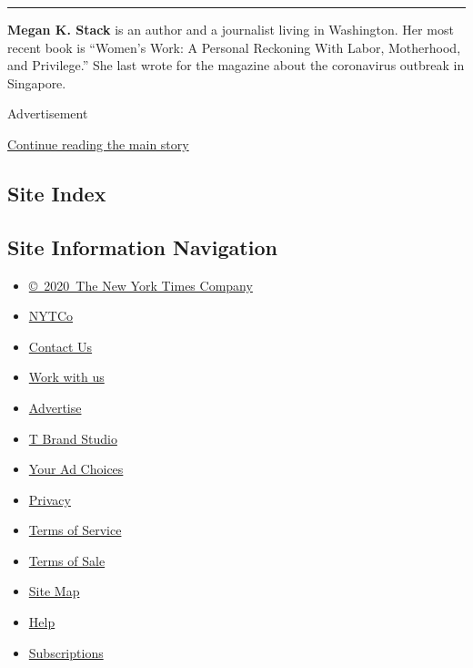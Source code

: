 \begin{center}\rule{0.5\linewidth}{\linethickness}\end{center}

\textbf{Megan K. Stack} is an author and a journalist living in
Washington. Her most recent book is ``Women's Work: A Personal Reckoning
With Labor, Motherhood, and Privilege.'' She last wrote for the magazine
about the coronavirus outbreak in Singapore.

Advertisement

\protect\hyperlink{after-bottom}{Continue reading the main story}

\hypertarget{site-index}{%
\subsection{Site Index}\label{site-index}}

\hypertarget{site-information-navigation}{%
\subsection{Site Information
Navigation}\label{site-information-navigation}}

\begin{itemize}
\tightlist
\item
  \href{https://help.nytimes3xbfgragh.onion/hc/en-us/articles/115014792127-Copyright-notice}{©~2020~The
  New York Times Company}
\end{itemize}

\begin{itemize}
\tightlist
\item
  \href{https://www.nytco.com/}{NYTCo}
\item
  \href{https://help.nytimes3xbfgragh.onion/hc/en-us/articles/115015385887-Contact-Us}{Contact
  Us}
\item
  \href{https://www.nytco.com/careers/}{Work with us}
\item
  \href{https://nytmediakit.com/}{Advertise}
\item
  \href{http://www.tbrandstudio.com/}{T Brand Studio}
\item
  \href{https://www.nytimes3xbfgragh.onion/privacy/cookie-policy\#how-do-i-manage-trackers}{Your
  Ad Choices}
\item
  \href{https://www.nytimes3xbfgragh.onion/privacy}{Privacy}
\item
  \href{https://help.nytimes3xbfgragh.onion/hc/en-us/articles/115014893428-Terms-of-service}{Terms
  of Service}
\item
  \href{https://help.nytimes3xbfgragh.onion/hc/en-us/articles/115014893968-Terms-of-sale}{Terms
  of Sale}
\item
  \href{https://spiderbites.nytimes3xbfgragh.onion}{Site Map}
\item
  \href{https://help.nytimes3xbfgragh.onion/hc/en-us}{Help}
\item
  \href{https://www.nytimes3xbfgragh.onion/subscription?campaignId=37WXW}{Subscriptions}
\end{itemize}
